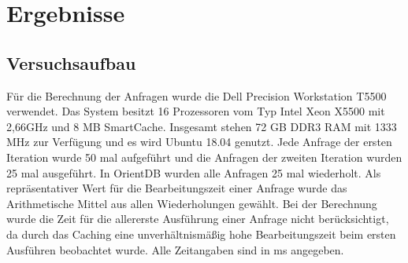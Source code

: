 
\chapter{Ergebnisse} %

\label{Kaptiel4} %

\section{Versuchsaufbau}
Für die Berechnung der Anfragen wurde die Dell Precision Workstation T5500 verwendet. Das System besitzt 16 Prozessoren vom Typ Intel Xeon  X5500 mit 2,66GHz und  8 MB SmartCache. Insgesamt stehen 72 GB DDR3 RAM mit 1333 MHz zur Verfügung und es wird Ubuntu 18.04 genutzt.\newline
 Jede Anfrage der ersten Iteration wurde 50 mal aufgeführt und die Anfragen der zweiten Iteration wurden 25 mal ausgeführt. In OrientDB wurden alle Anfragen 25 mal wiederholt. Als repräsentativer Wert für die Bearbeitungszeit einer Anfrage  wurde das Arithmetische Mittel aus allen Wiederholungen gewählt. Bei der Berechnung wurde die Zeit für die allererste Ausführung einer Anfrage nicht berücksichtigt, da durch das Caching eine unverhältnismäßig hohe Bearbeitungszeit beim ersten Ausführen beobachtet wurde. Alle Zeitangaben sind in ms angegeben. 
